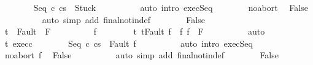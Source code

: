 \begin{isabellebody}
\ \ \ \ \ \ \isamarkupfalse%
\ {\isachardoublequoteopen}{\isasymGamma}{\isasymturnstile}{\isasymlangle}Seq\ c{}\ c{}{\isacharcomma}s{\isasymrangle}\ {\isasymRightarrow}\ Stuck{\isachardoublequoteclose}\isanewline
\ \ \ \ \ \ \ \ \isamarkupfalse%
\ {\isacharparenleft}auto\ intro{\isacharcolon}\ exec{\isacharunderscore}Seq{\isacharprime}{\isacharparenright}\isanewline
\ \ \ \ \ \ \isamarkupfalse%
\ noabort\ \isamarkupfalse%
\ False\isanewline
\ \ \ \ \ \ \ \ \isamarkupfalse%
\ {\isacharparenleft}auto\ simp\ add{\isacharcolon}\ final{\isacharunderscore}notin{\isacharunderscore}def{\isacharparenright}\isanewline
\ \ \ \ \ \ \isamarkupfalse%
\ False\ \isacommand{{\isachardot}{\isachardot}}\isamarkupfalse%
\isanewline
\ \ \ \ \isacommand{{\isacharbraceright}}\isamarkupfalse%
\isanewline
\ \ \ \ \isamarkupfalse%
\ \isanewline
\ \ \ \ \isacommand{{\isacharbraceleft}}\isamarkupfalse%
\isanewline
\ \ \ \ \ \ \isamarkupfalse%
\ {\isachardoublequoteopen}t\ {\isasymin}\ Fault\ {\isacharbackquote}\ F{\isachardoublequoteclose}\isanewline
\ \ \ \ \ \ \isamarkupfalse%
\ \isamarkupfalse%
\ f\ \ \isanewline
\ \ \ \ \ \ t{\isacharcolon}\ {\isachardoublequoteopen}t{\isacharequal}Fault\ f{\isachardoublequoteclose}\ \ f{\isacharcolon}\ {\isachardoublequoteopen}f\ {\isasymin}\ F{\isachardoublequoteclose}\isanewline
\ \ \ \ \ \ \ \ \isamarkupfalse%
\ auto\isanewline
\ \ \ \ \ \ \isamarkupfalse%
\ t\ exec{\isacharunderscore}c{}\isanewline
\ \ \ \ \ \ \isamarkupfalse%
\ {\isachardoublequoteopen}{\isasymGamma}{\isasymturnstile}{\isasymlangle}Seq\ c{}\ c{}{\isacharcomma}s{\isasymrangle}\ {\isasymRightarrow}\ Fault\ f{\isachardoublequoteclose}\isanewline
\ \ \ \ \ \ \ \ \isamarkupfalse%
\ {\isacharparenleft}auto\ intro{\isacharcolon}\ exec{\isacharunderscore}Seq{\isacharprime}{\isacharparenright}\isanewline
\ \ \ \ \ \ \isamarkupfalse%
\ noabort\ f\ \isamarkupfalse%
\ False\isanewline
\ \ \ \ \ \ \ \ \isamarkupfalse%
\ {\isacharparenleft}auto\ simp\ add{\isacharcolon}\ final{\isacharunderscore}notin{\isacharunderscore}def{\isacharparenright}\isanewline
\ \ \ \ \ \ \isamarkupfalse%
\ False\ \isacommand{{\isachardot}{\isachardot}}\isamarkupfalse%
\isanewline
\ \ \ \ \isacommand{{\isacharbraceright}}\isamarkupfalse%

\end{isabellebody}
